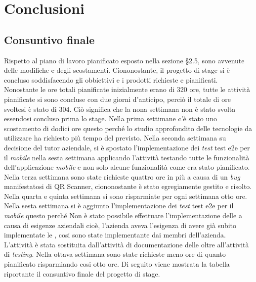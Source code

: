
\chapter{Conclusioni}
\label{cap:conclusioni}

\section{Consuntivo finale}
Rispetto al piano di lavoro pianificato esposto nella sezione §2.5, sono avvenute delle modifiche e degli scostamenti. Ciononostante, il progetto di stage si è concluso soddisfacendo gli obbiettivi e i prodotti richieste e pianificati. Nonostante le ore totali pianificate inizialmente erano di 320 ore, tutte le attività pianificate si sono concluse con due giorni d'anticipo, perciò il totale di ore svoltesi è stato di 304. Ciò significa che la nona settimana non è stato svolta essendosi concluso prima lo stage. Nella prima settimane c'è stato uno scostamento di dodici ore questo perché lo studio approfondito delle tecnologie da utilizzare ha richiesto più tempo del previsto. Nella seconda settimana su decisione del tutor aziendale, si è spostato l'implementazione dei \emph{test} \gls{test e2e} per il \emph{mobile} nella sesta settimana applicando l'attività testando tutte le funzionalità dell'applicazione \emph{mobile} e non solo alcune funzionalità come era stato pianificato. Nella terza settimana sono state richieste quattro ore in più a causa di un \emph{bug} manifestatosi di QR Scanner, ciononostante è stato egregiamente gestito e risolto. Nella quarta e quinta settimana si sono risparmiate per ogni settimana otto ore. Nella sesta settimana si è aggiunto l'implementazione dei \emph{test} \gls{test e2e} per il \emph{mobile} questo perché Non è stato possibile effettuare l'implementazione delle \textcolor{SchoolColor}{\ap{[g]}} a causa di esigenze aziendali cioè, l'azienda aveva l'esigenza di avere già subito implementate le \textcolor{SchoolColor}{\ap{[g]}}, cosi sono state implementante dai membri dell'azienda. L'attività è stata sostituita dall'attività di documentazione delle \textcolor{SchoolColor}{\ap{[g]}} oltre all'attività di \emph{testing}.
Nella ottava settimana sono state richieste meno ore di quanto pianificato risparmiando cosi otto ore.
Di seguito viene mostrata la tabella riportante il consuntivo finale del progetto di stage.

